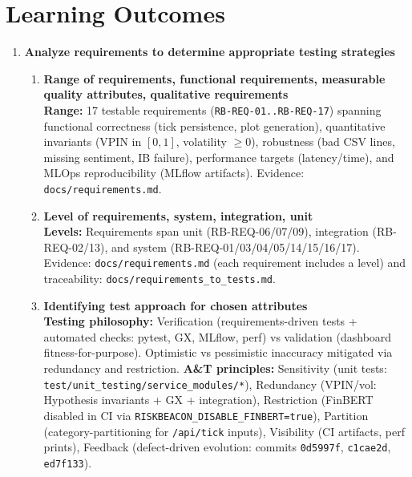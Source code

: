\documentclass[11pt]{article}
\begin{document}
\section{Learning Outcomes}
\begin{enumerate}
\item \textbf{Analyze requirements to determine appropriate testing strategies} \marginpar{[default 20\%]}
\begin{enumerate}
\item \textbf{Range of requirements, functional requirements, measurable quality attributes, qualitative requirements}\\
\textbf{Range:} 17 testable requirements (\texttt{RB-REQ-01..RB-REQ-17}) spanning functional correctness (tick persistence, plot generation), quantitative invariants (VPIN in $[0,1]$, volatility $\ge 0$), robustness (bad CSV lines, missing sentiment, IB failure), performance targets (latency/time), and MLOps reproducibility (MLflow artifacts). Evidence: \texttt{docs/requirements.md}.

\item \textbf{Level of requirements, system, integration, unit}\\
\textbf{Levels:} Requirements span unit (RB-REQ-06/07/09), integration (RB-REQ-02/13), and system (RB-REQ-01/03/04/05/14/15/16/17). Evidence: \texttt{docs/requirements.md} (each requirement includes a level) and traceability: \texttt{docs/requirements\_to\_tests.md}.

\item \textbf{Identifying test approach for chosen attributes}\\
\textbf{Testing philosophy:} Verification (requirements-driven tests + automated checks: pytest, GX, MLflow, perf) vs validation (dashboard fitness-for-purpose). Optimistic vs pessimistic inaccuracy mitigated via redundancy and restriction. \textbf{A\&T principles:} Sensitivity (unit tests: \texttt{test/unit\_testing/service\_modules/*}), Redundancy (VPIN/vol: Hypothesis invariants + GX + integration), Restriction (FinBERT disabled in CI via \texttt{RISKBEACON\_DISABLE\_FINBERT=true}), Partition (category-partitioning for \texttt{/api/tick} inputs), Visibility (CI artifacts, perf prints), Feedback (defect-driven evolution: commits \texttt{0d5997f}, \texttt{c1cae2d}, \texttt{ed7f133}).


\end{enumerate}
\end{enumerate}
\end{document}
